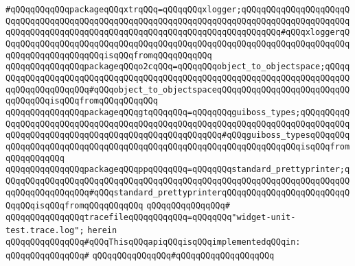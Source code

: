 \verb|#qQQqqQQqqQQqpackageqQQqxtrqQQq=qQQqqQQqxlogger;qQQqqQQqqQQqqQQqqQQqqQQqqQQqqQQqqQQqqQQqqQQqqQQqqQQqqQQqqQQqqQQqqQQqqQQqqQQqqQQqqQQqqQQqqQQqqQQqqQQqqQQqqQQqqQQqqQQqqQQqqQQqqQQqqQQqqQQqqQQqqQQqqQQq#qQQqxloggerqQQqqQQqqQQqqQQqqQQqqQQqqQQqqQQqqQQqqQQqqQQqqQQqqQQqqQQqqQQqqQQqqQQqqQQqqQQqqQQqqQQqqQQqqQQqisqQQqfromqQQqqQQqqQQq|\newline
\newline
\verb|qQQqqQQqqQQqqQQqpackageqQQqo2cqQQq=qQQqqQQqobject_to_objectspace;qQQqqQQqqQQqqQQqqQQqqQQqqQQqqQQqqQQqqQQqqQQqqQQqqQQqqQQqqQQqqQQqqQQqqQQqqQQqqQQqqQQqqQQqqQQq#qQQqobject_to_objectspaceqQQqqQQqqQQqqQQqqQQqqQQqqQQqqQQqqQQqisqQQqfromqQQqqQQqqQQq|\newline
\newline
\verb|qQQqqQQqqQQqqQQqpackageqQQqgtqQQqqQQq=qQQqqQQqguiboss_types;qQQqqQQqqQQqqQQqqQQqqQQqqQQqqQQqqQQqqQQqqQQqqQQqqQQqqQQqqQQqqQQqqQQqqQQqqQQqqQQqqQQqqQQqqQQqqQQqqQQqqQQqqQQqqQQqqQQqqQQqqQQq#qQQqguiboss_typesqQQqqQQqqQQqqQQqqQQqqQQqqQQqqQQqqQQqqQQqqQQqqQQqqQQqqQQqqQQqqQQqqQQqisqQQqfromqQQqqQQqqQQq|\newline
\newline
\verb|qQQqqQQqqQQqqQQqpackageqQQqppqQQqqQQq=qQQqqQQqstandard_prettyprinter;qQQqqQQqqQQqqQQqqQQqqQQqqQQqqQQqqQQqqQQqqQQqqQQqqQQqqQQqqQQqqQQqqQQqqQQqqQQqqQQqqQQqqQQq#qQQqstandard_prettyprinterqQQqqQQqqQQqqQQqqQQqqQQqqQQqqQQqisqQQqfromqQQqqQQqqQQq|\newline
\verb|qQQqqQQqqQQqqQQq#|\newline
\verb|qQQqqQQqqQQqqQQqtracefileqQQqqQQqqQQq=qQQqqQQq"widget-unit-test.trace.log";|\newline
\verb|herein|\newline
\newline
\verb|qQQqqQQqqQQqqQQq#qQQqThisqQQqapiqQQqisqQQqimplementedqQQqin:|\newline
\verb|qQQqqQQqqQQqqQQq#|\newline
\verb|qQQqqQQqqQQqqQQq#qQQqqQQqqQQqqQQqqQQq|\newline
